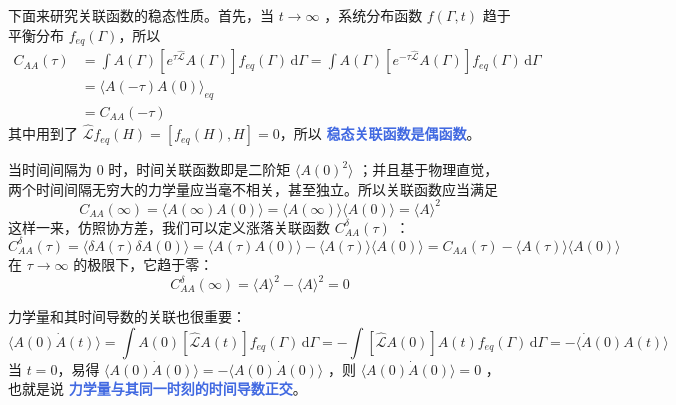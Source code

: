 下面来研究关联函数的稳态性质。首先，当 $t\rightarrow \infty$ ，系统分布函数 $f(\Gamma,t)$ 趋于平衡分布 $f_{eq}(\Gamma)$，所以
\begin{align}\label{equ:关联函数的稳态性质}
    C_{AA}(\tau) &= \int A(\Gamma)\left[e^{\tau\mathcal{\hat L}}A(\Gamma)\right]f_{eq}(\Gamma)\,\mathrm{d}\Gamma = \int A(\Gamma)\left[e^{-\tau\mathcal{\hat L}}A(\Gamma)\right]f_{eq}(\Gamma)\,\mathrm{d}\Gamma \\
    &= \langle A(-\tau)A(0) \rangle_{eq} \\&= C_{AA}(-\tau)
\end{align}
其中用到了 $\mathcal{\hat L}f_{eq}(H) = [f_{eq}(H), H] = 0$，所以 \textcolor{RoyalBlue}{\textbf{\kaishu 稳态关联函数是偶函数}}。

当时间间隔为 $0$ 时，时间关联函数即是二阶矩 $\langle A(0)^2 \rangle$ ；并且基于物理直觉，两个时间间隔无穷大的力学量应当毫不相关，甚至独立。所以关联函数应当满足
\begin{equation}\label{equ:关联函数的稳态性质，无穷大}
    C_{AA}(\infty) = \langle A(\infty)A(0) \rangle = \langle A(\infty) \rangle \langle A(0) \rangle = \langle A \rangle^2
\end{equation}
这样一来，仿照协方差，我们可以定义涨落关联函数 $C^\delta_{AA}(\tau)$ ：
\begin{equation}\label{equ:涨落关联函数}
    C^\delta_{AA}(\tau) = \langle \delta A(\tau)\delta A(0) \rangle = \langle A(\tau)A(0) \rangle - \langle A(\tau) \rangle \langle A(0) \rangle = C_{AA}(\tau) - \langle A(\tau) \rangle \langle A(0) \rangle
\end{equation}
在 $\tau \rightarrow \infty$ 的极限下，它趋于零：
\begin{equation}\label{equ:涨落关联函数的极限}
    C^\delta_{AA}(\infty) = \langle A \rangle^2 - \langle A \rangle^2 = 0
\end{equation}

力学量和其时间导数的关联也很重要：
\begin{equation}\label{equ:力学量和其时间导数的关联}
    \langle  A(0)\dot{A}(t) \rangle = \int A(0) [\mathcal{\hat L}A(t)]f_{eq}(\Gamma)\, \mathrm{d}\Gamma = -\int [\mathcal{\hat L}A(0)] A(t)f_{eq}(\Gamma)\, \mathrm{d}\Gamma = -\langle  \dot{A}(0)A(t) \rangle
\end{equation}
当 $t = 0$，易得 $\langle A(0)\dot{A}(0)\rangle = - \langle A(0)\dot{A}(0)\rangle$ ，则 $\langle A(0)\dot{A}(0)\rangle = 0$ ，也就是说 \textcolor{RoyalBlue}{\textbf{\kaishu 力学量与其同一时刻的时间导数正交}}。

